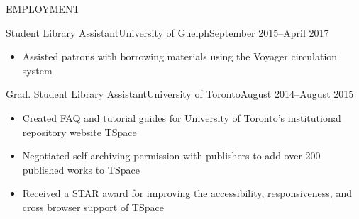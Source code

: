 \documentclass[]{mcdowellcv}
\begin{document}
	\begin{cvsection}{EMPLOYMENT}
		\begin{cvsubsection}{Student Library Assistant}{University of Guelph}{September 2015--April 2017}
			\begin{itemize}
				\item Assisted patrons with borrowing materials using the Voyager circulation system
			\end{itemize}
		\end{cvsubsection}
		
		
		\begin{cvsubsection}{Grad. Student Library Assistant}{University of Toronto}{August 2014--August 2015}		
			\begin{itemize}
	    	\item Created FAQ and tutorial guides for University of Toronto's institutional repository website TSpace
        \item Negotiated self-archiving permission with publishers to add over 200 published works to TSpace
        \item Received a STAR award for improving the accessibility, responsiveness, and cross browser support of TSpace 
			\end{itemize}
		\end{cvsubsection}
		
	\end{cvsection}
\end{document}
